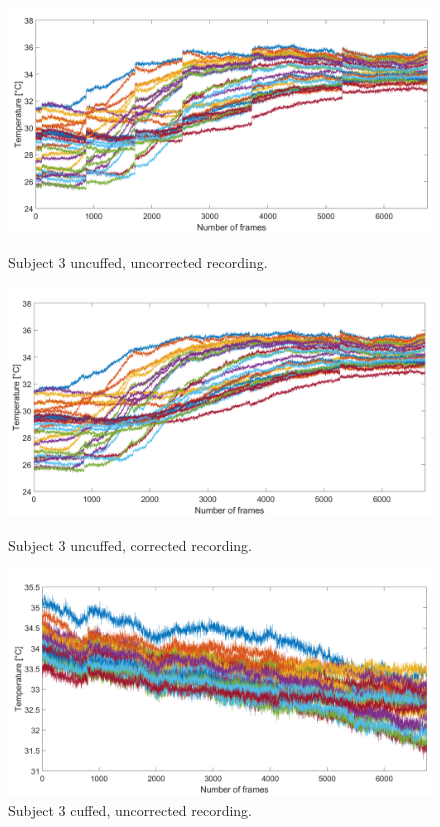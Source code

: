 \begin{figure}[htbp]
	\begin{minipage}[b]{0.45\linewidth}
		\centering
		\includegraphics[width=\linewidth]{figures/Recordings/Sub3_uncuffed_uncorr}
		\caption{Subject 3 uncuffed, uncorrected recording.}
		\label{fig:chapter001_dist_001}
	\end{minipage}
	\hspace{0.2cm}
	\begin{minipage}[b]{0.45\linewidth}
		\centering
		\includegraphics[width=\linewidth]{figures/Recordings/Sub3_uncuffed_corr}
		\caption{Subject 3 uncuffed, corrected recording.}
		\label{fig:chapter001_reward_001}
	\end{minipage}
	\hspace{0.2cm}
	\begin{minipage}[b]{0.45\linewidth}
		\centering
		\includegraphics[width=\linewidth]{figures/Recordings/Sub3_cuffed_uncorr}
		\caption{Subject 3 cuffed, uncorrected recording.}
	

\end{minipage}
\end{figure}
